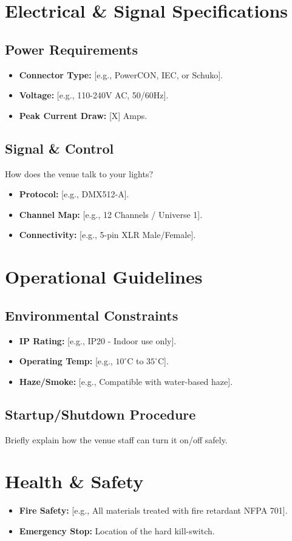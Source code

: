 \documentclass[11pt, a4paper]{article}
\begin{document}
\section{Electrical \& Signal Specifications}
\subsection{Power Requirements}
\begin{itemize}
    \item \textbf{Connector Type:} [e.g., PowerCON, IEC, or Schuko].
    \item \textbf{Voltage:} [e.g., 110-240V AC, 50/60Hz].
    \item \textbf{Peak Current Draw:} [X] Amps.
\end{itemize}

\subsection{Signal \& Control}
How does the venue talk to your lights?
\begin{itemize}
    \item \textbf{Protocol:} [e.g., DMX512-A].
    \item \textbf{Channel Map:} [e.g., 12 Channels / Universe 1].
    \item \textbf{Connectivity:} [e.g., 5-pin XLR Male/Female].
\end{itemize}

\section{Operational Guidelines}
\subsection{Environmental Constraints}
\begin{itemize}
    \item \textbf{IP Rating:} [e.g., IP20 - Indoor use only].
    \item \textbf{Operating Temp:} [e.g., $10^\circ$C to $35^\circ$C].
    \item \textbf{Haze/Smoke:} [e.g., Compatible with water-based haze].
\end{itemize}

\subsection{Startup/Shutdown Procedure}
Briefly explain how the venue staff can turn it on/off safely.

\section{Health \& Safety}
\begin{itemize}
    \item \textbf{Fire Safety:} [e.g., All materials treated with fire retardant NFPA 701].
    \item \textbf{Emergency Stop:} Location of the hard kill-switch.
\end{itemize}
\end{document}
